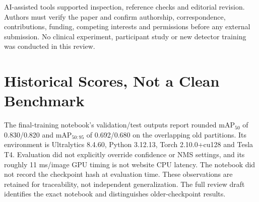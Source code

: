 \documentclass[conference]{IEEEtran}
\begin{document}
AI-assisted tools supported inspection, reference checks and editorial revision. Authors must verify the paper and confirm authorship, correspondence, contributions, funding, competing interests and permissions before any external submission. No clinical experiment, participant study or new detector training was conducted in this review.

\appendices
\section{Historical Scores, Not a Clean Benchmark}
The final-training notebook's validation/test outputs report rounded mAP$_{50}$ of 0.830/0.820 and mAP$_{50:95}$ of 0.692/0.680 on the overlapping old partitions. Its environment is Ultralytics 8.4.60, Python 3.12.13, Torch 2.10.0+cu128 and Tesla T4. Evaluation did not explicitly override confidence or NMS settings, and its roughly 11 ms/image GPU timing is not website CPU latency. The notebook did not record the checkpoint hash at evaluation time. These observations are retained for traceability, not independent generalization. The full review draft identifies the exact notebook and distinguishes older-checkpoint results.



\end{document}
